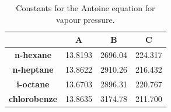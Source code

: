 \documentclass[calculator,allquestions,datasheet,solutions]{exam_newMarcus2}
\begin{document}
\begin{question}
\begin{table}[h]
\begin{center}
\begin{tabular}{||c | c c c ||} 
\hline\hline
                           & {\bf A}    &  {\bf B}    & {\bf C}    \\
\hline
{\bf n-hexane}             & 13.8193    & 2696.04     & 224.317    \\  
{\bf n-heptane}            & 13.8622    & 2910.26     & 216.432    \\  
{\bf i-octane}             & 13.6703    & 2896.31     & 220.767    \\ 
{\bf chlorobenze}           & 13.8635    & 3174.78     & 211.700    \\  
\hline\hline
\end{tabular}
\caption{Constants for the Antoine equation for vapour pressure.}
\label{Practical1:Table2}
\end{center}
\end{table}

\end{question}

\clearpage
\end{document}
